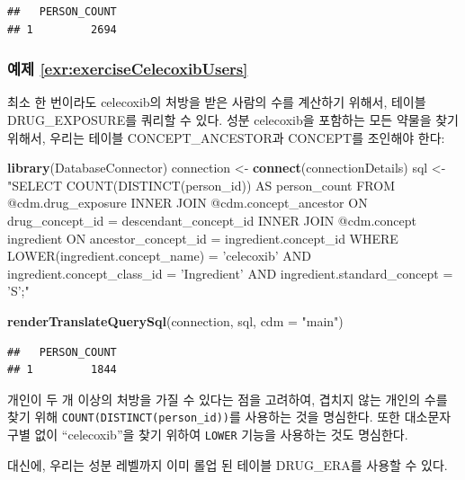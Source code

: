 \documentclass[11pt]{book}
\newenvironment{Shaded}{\begin{snugshade}}{\end{snugshade}}
\newcommand{\KeywordTok}[1]{\textcolor[rgb]{0.13,0.29,0.53}{\textbf{#1}}}
\newcommand{\DataTypeTok}[1]{\textcolor[rgb]{0.13,0.29,0.53}{#1}}
\newcommand{\StringTok}[1]{\textcolor[rgb]{0.31,0.60,0.02}{#1}}
\newcommand{\NormalTok}[1]{#1}
\theoremstyle{definition}
\theoremstyle{definition}
\theoremstyle{definition}
\theoremstyle{remark}
\begin{document}
\begin{verbatim}
##   PERSON_COUNT
## 1         2694
\end{verbatim}

\subsubsection*{예제
\ref{exr:exerciseCelecoxibUsers}}\label{-refexrexercisecelecoxibusers}

최소 한 번이라도 celecoxib의 처방을 받은 사람의 수를 계산하기 위해서,
테이블 DRUG\_EXPOSURE를 쿼리할 수 있다. 성분 celecoxib을 포함하는 모든
약물을 찾기 위해서, 우리는 테이블 CONCEPT\_ANCESTOR과 CONCEPT를 조인해야
한다:

\begin{Shaded}
\begin{Highlighting}[]
\KeywordTok{library}\NormalTok{(DatabaseConnector)}
\NormalTok{connection <-}\StringTok{ }\KeywordTok{connect}\NormalTok{(connectionDetails)}
\NormalTok{sql <-}\StringTok{ "SELECT COUNT(DISTINCT(person_id)) AS person_count}
\StringTok{FROM @cdm.drug_exposure}
\StringTok{INNER JOIN @cdm.concept_ancestor}
\StringTok{  ON drug_concept_id = descendant_concept_id}
\StringTok{INNER JOIN @cdm.concept ingredient}
\StringTok{  ON ancestor_concept_id = ingredient.concept_id}
\StringTok{WHERE LOWER(ingredient.concept_name) = 'celecoxib'}
\StringTok{  AND ingredient.concept_class_id = 'Ingredient'}
\StringTok{  AND ingredient.standard_concept = 'S';"}

\KeywordTok{renderTranslateQuerySql}\NormalTok{(connection, sql, }\DataTypeTok{cdm =} \StringTok{"main"}\NormalTok{)}
\end{Highlighting}
\end{Shaded}

\begin{verbatim}
##   PERSON_COUNT
## 1         1844
\end{verbatim}

개인이 두 개 이상의 처방을 가질 수 있다는 점을 고려하여, 겹치지 않는
개인의 수를 찾기 위해 \texttt{COUNT(DISTINCT(person\_id))}를 사용하는
것을 명심한다. 또한 대소문자 구별 없이 ``celecoxib''을 찾기 위하여
\texttt{LOWER} 기능을 사용하는 것도 명심한다.

대신에, 우리는 성분 레벨까지 이미 롤업 된 테이블 DRUG\_ERA를 사용할 수
있다.
\end{document}
